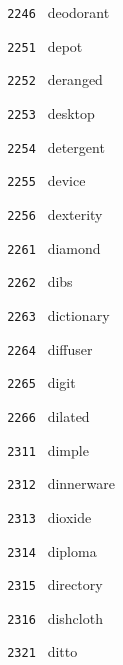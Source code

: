 \documentclass[11pt]{article}
\begin{document}
\begin{multicols}{6}
\noindent \texttt{ 2246 } \hspace{1mm} deodorant  \par
\noindent \texttt{ 2251 } \hspace{1mm} depot  \par
\noindent \texttt{ 2252 } \hspace{1mm} deranged  \par
\noindent \texttt{ 2253 } \hspace{1mm} desktop  \par
\noindent \texttt{ 2254 } \hspace{1mm} detergent  \par
\noindent \texttt{ 2255 } \hspace{1mm} device  \par
\noindent \texttt{ 2256 } \hspace{1mm} dexterity  \par
\noindent \texttt{ 2261 } \hspace{1mm} diamond  \par
\noindent \texttt{ 2262 } \hspace{1mm} dibs  \par
\noindent \texttt{ 2263 } \hspace{1mm} dictionary  \par
\noindent \texttt{ 2264 } \hspace{1mm} diffuser  \par
\noindent \texttt{ 2265 } \hspace{1mm} digit  \par
\noindent \texttt{ 2266 } \hspace{1mm} dilated  \par
\noindent \texttt{ 2311 } \hspace{1mm} dimple  \par
\noindent \texttt{ 2312 } \hspace{1mm} dinnerware  \par
\noindent \texttt{ 2313 } \hspace{1mm} dioxide  \par
\noindent \texttt{ 2314 } \hspace{1mm} diploma  \par
\noindent \texttt{ 2315 } \hspace{1mm} directory  \par
\noindent \texttt{ 2316 } \hspace{1mm} dishcloth  \par
\noindent \texttt{ 2321 } \hspace{1mm} ditto  \par

\end{multicols}
\end{document}
